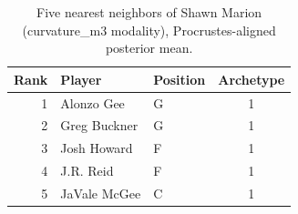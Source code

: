 \begin{table}[htbp]
  \centering\small
  \begin{tabular}{rllc}
    \toprule
    Rank & Player & Position & Archetype \\
    \midrule
    1 & Alonzo Gee & G & 1 \\
    2 & Greg Buckner & G & 1 \\
    3 & Josh Howard & F & 1 \\
    4 & J.R. Reid & F & 1 \\
    5 & JaVale McGee & C & 1 \\
    \bottomrule
  \end{tabular}
  \caption{Five nearest neighbors of Shawn Marion (curvature_m3 modality), Procrustes-aligned posterior mean.}
  \label{tab:Shawn_Marion_neighbors_curvature_m3}
\end{table}

